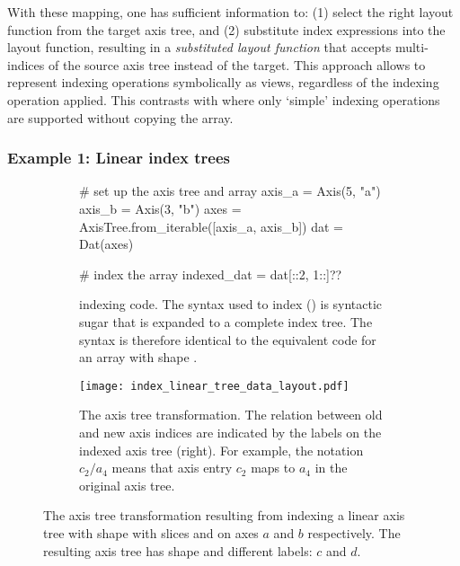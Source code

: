 \documentclass[thesis]{subfiles}
\begin{document}
With these mapping, one has sufficient information to:
(1) select the right layout function from the target axis tree, and
(2) substitute index expressions into the layout function, resulting in a \emph{substituted layout function} that accepts multi-indices of the source axis tree instead of the target.
This approach allows  to represent indexing operations symbolically as views, regardless of the indexing operation applied.
This contrasts with \numpy{} where only `simple' indexing operations are supported without copying the array.

\subsubsection{Example 1: Linear index trees} \label{example:linear_index_tree}

\begin{figure}
  \centering
  \begin{subfigure}{.9\textwidth}
    \begin{pyalg2}
      # set up the axis tree and array
      axis_a = Axis(5, "a")
      axis_b = Axis(3, "b")
      axes = AxisTree.from_iterable([axis_a, axis_b])
      dat = Dat(axes)

      # index the array
      indexed_dat = dat[::2, 1::]?\label{code:index_linear_apply}?
    \end{pyalg2}

    \caption{
       indexing code.
      The syntax used to index  (\pycode{[::2, 1::]}) is syntactic sugar that is expanded to a complete index tree.
      The syntax is therefore identical to the equivalent \numpy{} code for an array with shape .
    }
    \label{fig:index_linear_code}
  \end{subfigure}

  \vspace{1em}

  \begin{subfigure}{\textwidth}
    \centering
    \texttt{[image: index\_linear\_tree\_data\_layout.pdf]}
    \caption{
      The axis tree transformation.
      The relation between old and new axis indices are indicated by the labels on the indexed axis tree (right).
      For example, the notation $c_2/a_4$ means that axis entry $c_2$ maps to $a_4$ in the original axis tree.
    }
    \label{fig:index_linear_transform}
  \end{subfigure}

  \caption{
    The axis tree transformation resulting from indexing a linear axis tree with shape  with slices \pycode{[::2]} and \pycode{[1::]} on axes $a$ and $b$ respectively.
    The resulting axis tree has shape  and different labels: $c$ and $d$.
  }
  \label{fig:index_linear}
\end{figure}
\end{document}
